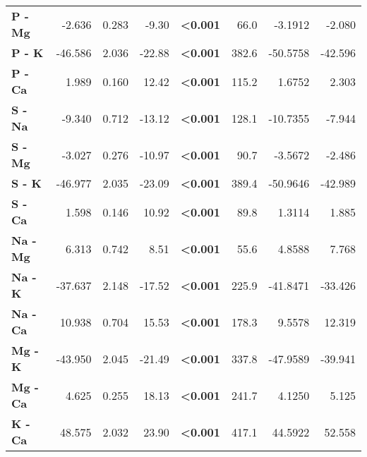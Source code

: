 \begin{table}[H]
\begin{tabular}[t]{>{}lrrr>{}rrrr}
\textbf{P - Mg} & -2.636 & 0.283 & -9.30 & \textbf{<0.001} & 66.0 & -3.1912 & -2.080\\
\textbf{P - K} & -46.586 & 2.036 & -22.88 & \textbf{<0.001} & 382.6 & -50.5758 & -42.596\\
\textbf{P - Ca} & 1.989 & 0.160 & 12.42 & \textbf{<0.001} & 115.2 & 1.6752 & 2.303\\
\textbf{S - Na} & -9.340 & 0.712 & -13.12 & \textbf{<0.001} & 128.1 & -10.7355 & -7.944\\
\textbf{S - Mg} & -3.027 & 0.276 & -10.97 & \textbf{<0.001} & 90.7 & -3.5672 & -2.486\\
\textbf{S - K} & -46.977 & 2.035 & -23.09 & \textbf{<0.001} & 389.4 & -50.9646 & -42.989\\
\textbf{S - Ca} & 1.598 & 0.146 & 10.92 & \textbf{<0.001} & 89.8 & 1.3114 & 1.885\\
\textbf{Na - Mg} & 6.313 & 0.742 & 8.51 & \textbf{<0.001} & 55.6 & 4.8588 & 7.768\\
\textbf{Na - K} & -37.637 & 2.148 & -17.52 & \textbf{<0.001} & 225.9 & -41.8471 & -33.426\\
\textbf{Na - Ca} & 10.938 & 0.704 & 15.53 & \textbf{<0.001} & 178.3 & 9.5578 & 12.319\\
\textbf{Mg - K} & -43.950 & 2.045 & -21.49 & \textbf{<0.001} & 337.8 & -47.9589 & -39.941\\
\textbf{Mg - Ca} & 4.625 & 0.255 & 18.13 & \textbf{<0.001} & 241.7 & 4.1250 & 5.125\\
\textbf{K - Ca} & 48.575 & 2.032 & 23.90 & \textbf{<0.001} & 417.1 & 44.5922 & 52.558\\
\bottomrule
\end{tabular}
\end{table}
